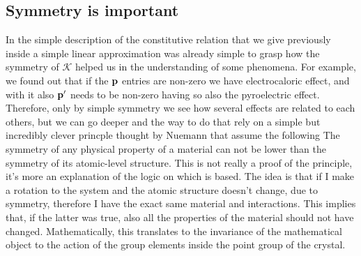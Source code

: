 \subsection{Symmetry is important}

In the simple description of the constitutive relation that we give previously inside a simple linear approximation was already simple to grasp how the symmetry of $\mathcal{K}$ helped us in the understanding of some phenomena. For example, we found out that if the $\vb{p}$ entries are non-zero we have electrocaloric effect, and with it also $\vb{p}'$ needs to be non-zero having so also the pyroelectric effect. Therefore, only by simple symmetry we see how several effects are related to each others, but we can go deeper and the way to do that rely on a simple but incredibly clever princple thought by Nuemann that assume the following
{
    The symmetry of any physical property of a material can not be lower than the symmetry of its atomic-level structure.
}
{
    This is not really a proof of the principle, it's more an explanation of the logic on which is based. The idea is that if I make a rotation to the system and the atomic structure doesn't change, due to symmetry, therefore I have the exact same material and interactions. This implies that, if the latter was true, also all the properties of the material should not have changed. Mathematically, this translates to the invariance of the mathematical object to the action of the group elements inside the point group of the crystal.
}

